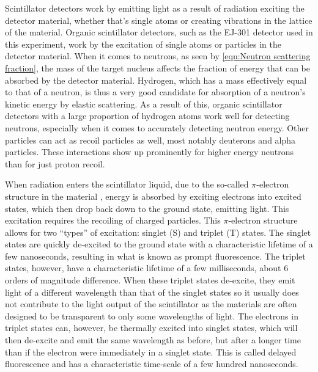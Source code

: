 \documentclass[11pt]{article}
\numberwithin{equation}{section}
\numberwithin{figure}{section}
\numberwithin{table}{section}
\begin{document}
\par Scintillator detectors work by emitting light as a result of radiation exciting the detector material, whether that's single atoms or creating vibrations in the lattice of the material. Organic scintillator detectors, such as the EJ-301 detector used in this experiment, work by the excitation of single atoms or particles in the detector material. When it comes to neutrons, as seen by \cref{eqn:Neutron scattering fraction}, the mass of the target nucleus affects the fraction of energy that can be absorbed by the detector material. Hydrogen, which has a mass effectively equal to that of a neutron, is thus a very good candidate for absorption of a neutron's kinetic energy by elastic scattering. As a result of this, organic scintillator detectors with a large proportion of hydrogen atoms work well for detecting neutrons, especially when it comes to accurately detecting neutron energy. Other particles can act as recoil particles as well, most notably deuterons and alpha particles. These interactions show up prominently for higher energy neutrons than for just proton recoil.
\newline
\par When radiation enters the scintillator liquid, due to the so-called $\pi$-electron structure in the material \cite{Knoll}, energy is absorbed by exciting electrons into excited states, which then drop back down to the ground state, emitting light. This excitation requires the recoiling of charged particles. This $\pi$-electron structure allows for two ``types'' of excitation: singlet (S) and triplet (T) states. The singlet states are quickly de-excited to the ground state with a characteristic lifetime of a few nanoseconds, resulting in what is known as prompt fluorescence. The triplet states, however, have a characteristic lifetime of a few milliseconds, about 6 orders of magnitude difference. When these triplet states de-excite, they emit light of a different wavelength than that of the singlet states so it usually does not contribute to the light output of the scintillator as the materials are often designed to be transparent to only some wavelengths of light. The electrons in triplet states can, however, be thermally excited into singlet states, which will then de-excite and emit the same wavelength as before, but after a longer time than if the electron were immediately in a singlet state. This is called delayed fluorescence and has a characteristic time-scale of a few hundred nanoseconds.
\end{document}
